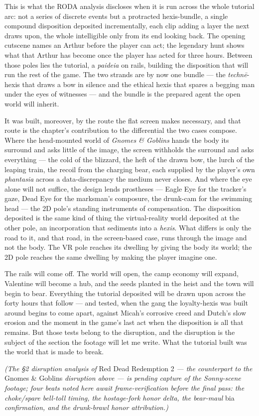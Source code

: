 \documentclass{article}
\begin{document}
This is what the RODA analysis discloses when it is run across the whole tutorial arc: not a series of discrete events but a protracted hexis-bundle, a single compound disposition deposited incrementally, each clip adding a layer the next draws upon, the whole intelligible only from its end looking back. The opening cutscene names an Arthur before the player can act; the legendary hunt shows what that Arthur has become once the player has acted for three hours. Between those poles lies the tutorial, a \textit{paideia} on rails, building the disposition that will run the rest of the game. The two strands are by now one bundle — the \textit{technē}-hexis that draws a bow in silence and the ethical hexis that spares a begging man under the eyes of witnesses — and the bundle is the prepared agent the open world will inherit.

It was built, moreover, by the route the flat screen makes necessary, and that route is the chapter's contribution to the differential the two cases compose. Where the head-mounted world of \textit{Gnomes \& Goblins} hands the body its surround and asks little of the image, the screen withholds the surround and asks everything — the cold of the blizzard, the heft of the drawn bow, the lurch of the leaping train, the recoil from the charging bear, each supplied by the player's own \textit{phantasia} across a data-discrepancy the medium never closes. And where the eye alone will not suffice, the design lends prostheses — Eagle Eye for the tracker's gaze, Dead Eye for the marksman's composure, the drunk-cam for the swimming head — the 2D pole's standing instruments of compensation. The disposition deposited is the same kind of thing the virtual-reality world deposited at the other pole, an incorporation that sediments into a \textit{hexis}. What differs is only the road to it, and that road, in the screen-based case, runs through the image and not the body. The VR pole reaches its dwelling by giving the body its world; the 2D pole reaches the same dwelling by making the player imagine one.

The rails will come off. The world will open, the camp economy will expand, Valentine will become a hub, and the seeds planted in the heist and the town will begin to bear. Everything the tutorial deposited will be drawn upon across the forty hours that follow — and tested, when the gang the loyalty-hexis was built around begins to come apart, against Micah's corrosive creed and Dutch's slow erosion and the moment in the game's last act when the disposition is all that remains. But those tests belong to the disruption, and the disruption is the subject of the section the footage will let me write. What the tutorial built was the world that is made to break.

\textit{(The §2 disruption analysis of} Red Dead Redemption 2 \textit{— the counterpart to the} Gnomes \& Goblins \textit{disruption above — is pending capture of the Sonny-scene footage; four beats noted here await frame-verification before the final pass: the choke/spare bell-toll timing, the hostage-fork honor delta, the bear-maul} bia \textit{confirmation, and the drunk-brawl honor attribution.)}
\end{document}

